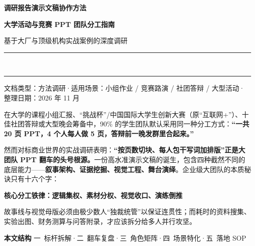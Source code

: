 \documentclass[UTF8,a4paper,11pt,fontset=none]{ctexart}
\newcommand{\boxtitle}[2]{%
  {\sffamily\bfseries\color{#1}#2\par}\vspace{0.32em}}
\begin{document}
\thispagestyle{plain}

{\sffamily\small\bfseries\color{accent}调研报告\quad\raisebox{0.1ex}{\textcolor{accent!45}{|}}\quad 演示文稿协作方法\par}
\vspace{9pt}

{\sffamily\bfseries\fontsize{22.5}{30}\selectfont\color{primary}
大学活动与竞赛 PPT 团队分工指南\par}
\vspace{5pt}

{\sffamily\fontsize{11.5}{17}\selectfont\color{muted}基于大厂与顶级机构实战案例的深度调研\par}
\vspace{12pt}

{\color{accent}\rule{\textwidth}{2.2pt}}\\[2.2pt]
{\color{primary!25}\rule{\textwidth}{0.5pt}}

\vspace{7pt}
{\sffamily\scriptsize\color{muted}文档类型：方法调研\quad·\quad 适用场景：小组作业 / 竞赛路演 / 社团答辩 / 大型活动\quad·\quad 整理日期：2026 年 11 月}

\vspace{14pt}

在大学的课程小组汇报、“挑战杯”/中国国际大学生创新大赛（原“互联网+”）、十佳社团答辩或大型晚会筹备中，90\% 的学生团队默认采用同一种分工方式：\textbf{“一共 20 页 PPT，4 个人每人做 5 页，答辩前一晚发群里合起来。”}

然而对标商业世界的实战调研表明：\textbf{“按页数切块、每人包干写词加排版”正是大团队 PPT 翻车的头号根源。}一份高水准演示文稿的诞生，包含四种截然不同的底层能力——\textbf{叙事架构、证据挖掘、视觉工程、舞台演绎}。企业级大团队的本质秘诀只有十六个字：

\begin{keybox}
\boxtitle{primary}{\fontsize{13.5}{18}\selectfont 核心分工铁律：逻辑集权、素材分权、视觉收口、演练倒推}\vspace{2pt}
故事线与视觉母版必须由极少数人“独裁统管”以保证连贯性；而耗时的资料搜集、实验出图、财务测算与问答附录，才应该拆分给多人并行攻坚。
\end{keybox}

\begin{tcolorbox}[enhanced, colback=white, colframe=primary!18, boxrule=0.5pt, arc=1.5pt,
  left=8pt, right=8pt, top=6pt, bottom=6pt, before skip=4pt, after skip=6pt]
{\sffamily\scriptsize\bfseries\color{primary}本文结构}\hspace{1.1em}%
{\sffamily\scriptsize\color{muted}一\ 标杆拆解\quad·\quad 二\ 翻车复盘\quad·\quad 三\ 角色矩阵\quad·\quad 四\ 场景特化\quad·\quad 五\ 落地 SOP}
\end{tcolorbox}
\end{document}
